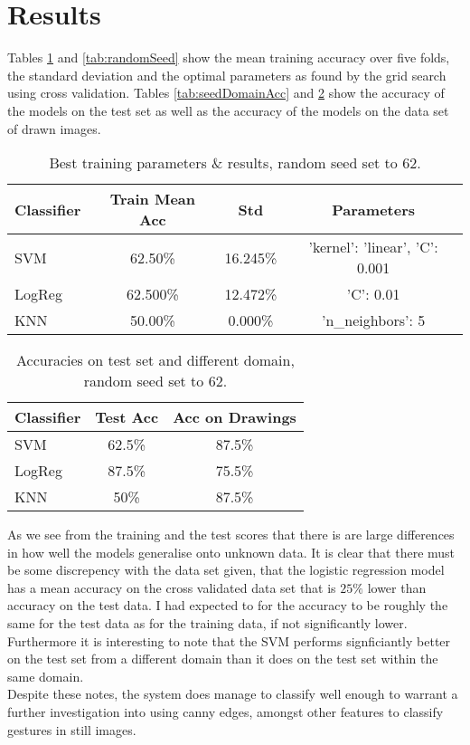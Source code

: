 \documentclass[11pt, a4paper]{article}
\begin{document}
\section{Results}
Tables \ref{tab:TrainAcc} and \ref{tab:randomSeed} show the mean training accuracy over five folds, the standard deviation and the optimal parameters as found by the grid search using cross validation. Tables \ref{tab:seedDomainAcc} and \ref{tab:testDomainAcc} show the accuracy of the models on the test set as well as the accuracy of the models on the data set of drawn images. \\

\begin{table}[h]
  \centering
  \small
  \setlength\tabcolsep{2pt}
    \begin{tabular}{l|ccc}
    Classifier & Train Mean Acc & Std      & Parameters                     \\\hline
    SVM        & 62.50\%        & 16.245\% & 'kernel': 'linear', 'C': 0.001 \\
    LogReg     & 62.500\%       & 12.472\% & 'C': 0.01                      \\
    KNN        & 50.00\%        & 0.000\%  & 'n\_neighbors': 5
    \end{tabular}
  \caption{Best training parameters \& results, random seed set to 62.}
  \label{tab:TrainAcc}
\end{table}
\begin{table}[h]
  \centering
    \begin{tabular}{l|cc}
    Classifier & Test Acc & Acc on Drawings \\\hline
    SVM        & 62.5\%   & 87.5\%          \\
    LogReg     & 87.5\%   & 75.5\%          \\
    KNN        & 50\%     & 87.5\%
    \end{tabular}
  \caption{Accuracies on test set and different domain, random seed set to 62.}
  \label{tab:testDomainAcc}
\end{table}

As we see from the training and the test scores that there is are large differences in how well the models generalise onto unknown data. It is clear that there must be some discrepency with the data set given, that the logistic regression model has a mean accuracy on the cross validated data set that is \(25\%\) lower than accuracy on the test data. I had expected to for the accuracy to be roughly the same for the test data as for the training data, if not significantly lower. Furthermore it is interesting to note that the SVM performs signficiantly better on the test set from a different domain than it does on the test set within the same domain.\\
Despite these notes, the system does manage to classify well enough to warrant a further investigation into using canny edges, amongst other features to classify gestures in still images.
\end{document}
